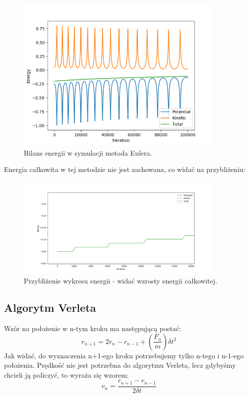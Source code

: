 \documentclass[10pt,a4paper]{article}
\begin{document}
	\begin{figure}[htp!!!!!!]	
		\begin{center}
			\includegraphics[width = 0.9\textwidth]{euler_energy.png}
			\caption{Bilans energii w symulacji metoda Eulera.}
			\label{schemat}
		\end{center}
	\end{figure} 
	
	Energia całkowita w tej metodzie nie jest zachowana, co widać na przybliżeniu:
	\begin{figure}[htp!!!!!!!!]	
		\begin{center}
			\includegraphics[width = 0.9\textwidth]{euler_energy_closeup.png}
			\caption{Przybliżenie wykresu energii - widać wzrosty energii całkowitej.}
			\label{schemat}
		\end{center}
	\end{figure} 
	
\subsection*{Algorytm Verleta}
	Wzór na położenie w n-tym kroku ma następującą postać:
	$$ r_{n+1} = 2r_{n} - r_{n-1} + ( \frac{F_{n}}{m}) \delta t^2 $$
	Jak widać, do wyznaczenia n+1-ego kroku potrzebujemy tylko n-tego i n-1-ego położenia.
	Prędkość nie jest potrzebna do algorytmu Verleta, lecz gdybyśmy chcieli ją policzyć, 
	to wyraża się wzorem:
	$$ v_{n} = \frac{r_{n+1} - r_{n-1}}{2 \delta t} $$
	
\end{document}

